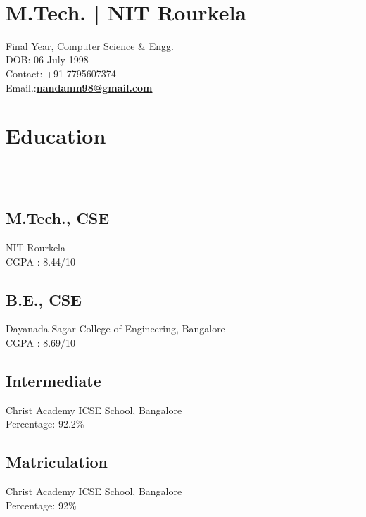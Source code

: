 \documentclass[]{../../rahulworld-resume}
\begin{document}
%
%

\begin{minipage}[t]{0.38\textwidth} 
\begin{large}
	\\
\end{large}
\section{M.Tech. | NIT Rourkela}
\vspace{0.2 cm}
Final Year, Computer Science \&  Engg.\\
DOB: 06 July 1998\\
Contact: +91 7795607374\\
Email.:\textbf{\href{mailto:nandanm98@gmail.com}{nandanm98@gmail.com}}
\section{Education} 
\noindent\rule{7cm}{0.4pt}\\
\subsection{M.Tech., CSE}
NIT Rourkela \\
CGPA : 8.44/10\\
\vspace{4pt}
\subsection{B.E., CSE}
Dayanada Sagar College of Engineering, Bangalore \\
CGPA : 8.69/10\\
\vspace{4pt}
\subsection{Intermediate}
Christ Academy ICSE School, Bangalore\\
Percentage: 92.2\%\\
\vspace{4pt}
\subsection{Matriculation}
Christ Academy ICSE School, Bangalore\\
Percentage: 92\%\\

\end{minipage}
\end{document}
